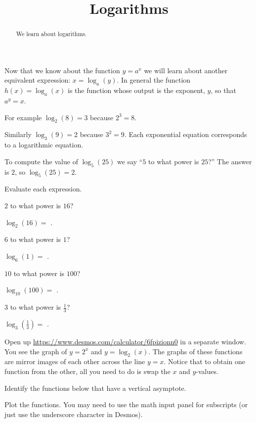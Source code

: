 \documentclass{ximera}
\title{Logarithms}
\begin{document}
\begin{abstract}
We learn about logarithms.
\end{abstract}
\maketitle

Now that we know about the function $y=a^x$ we will learn about another equivalent expression: $x=\log_a(y)$. In general the function $h(x)=\log_a(x)$ is the function whose output is the exponent, $y$, so that $a^y=x$.

For example $\log_2(8)=3$ because $2^3=8$. 

Similarly $\log_3(9)=2$ because $3^2=9$. Each exponential equation corresponds to a logarithmic equation. 

To compute the value of $\log_5(25)$ we say ``$5$ to what power is $25$?'' The answer is $2$, so $\log_5(25)=2$.

\begin{question}
Evaluate each expression.
\begin{solution}
\begin{hint}
$2$ to what power is $16$? 
\end{hint}
$\log_2(16)=$ .
\begin{hint}
$6$ to what power is $1$? 
\end{hint}
$\log_6(1)=$ .
\begin{hint}
$10$ to what power is $100$? 
\end{hint}
$\log_{10}(100)=$ .
\begin{hint}
$3$ to what power is $\frac{1}{3}$? 
\end{hint}
$\log_{3}\left(\frac{1}{3}\right)=$ .
\end{solution}
\end{question}



Open up \url{https://www.desmos.com/calculator/6fpizionn0} in a separate window. You see the graph of $y=2^x$ and $y=\log_2(x)$. The graphs of these functions are mirror images of each other across the line $y=x$. Notice that to obtain one function from the other, all you need to do is swap the $x$ and $y$-values. 

\begin{question}
Identify the functions below that have a vertical asymptote.
  \begin{solution}
    \begin{hint}
      Plot the functions. You may need to use the math input panel for subscripts (or just use the underscore character in Desmos).
    \end{hint}
    \begin{multiple-choice}
    \end{multiple-choice}
  \end{solution}
\end{question}
\end{document}
